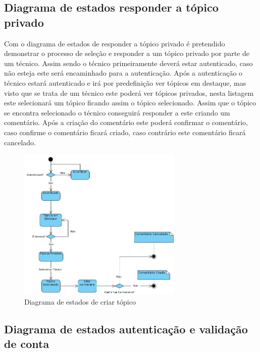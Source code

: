 \newpage

\subsection{Diagrama de estados responder a tópico privado}

Com o diagrama de estados de responder a tópico privado é pretendido demonstrar o processo de seleção e responder a um tópico privado por parte de um técnico. Assim sendo o técnico primeiramente deverá estar autenticado, caso não esteja este será encaminhado para a autenticação. Após a autenticação o técnico estará autenticado e irá por predefinição ver tópicos em destaque, mas visto que se trata de um técnico este poderá ver tópicos privados, nesta listagem este selecionará um tópico ficando assim o tópico selecionado. Assim que o tópico se encontra selecionado o técnico conseguirá responder a este criando um comentário. Após a criação do comentário este poderá confirmar o comentário, caso confirme o comentário ficará criado, caso contrário este comentário ficará cancelado.

\begin{figure}[htb]
    \centering
    \includegraphics[width=0.7\textwidth]{images/diagramas/estados/responder_topico_tecnico.png}
    \caption{Diagrama de estados de criar tópico}
    \label{fig:28}
\end{figure}

\newpage

\subsection{Diagrama de estados autenticação e validação de conta}

